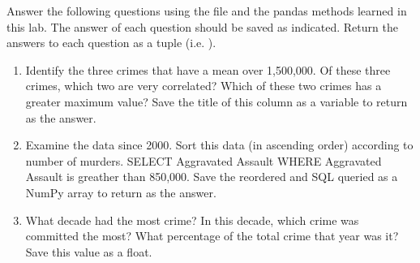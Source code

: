 \begin{problem}
Answer the following questions using the file  and the pandas methods learned in this lab.
The answer of each question should be saved as indicated.
Return the answers to each question as a tuple (i.e. ).

\begin{enumerate}
	\item Identify the three crimes that have a mean over 1,500,000. 
	Of these three crimes, which two are very correlated? 
	Which of these two crimes has a greater maximum value?
	Save the title of this column as a variable to return as the answer.
	\item Examine the data since 2000.
	Sort this data (in ascending order) according to number of murders.
	SELECT Aggravated Assault WHERE Aggravated Assault is greather than 850,000.
	Save the reordered and SQL queried  as a NumPy array to return as the answer.
	\item What decade had the most crime? 
	In this decade, which crime was committed the most? 
	What percentage of the total crime that year was it? 
	Save this value as a float.
\end{enumerate}
\end{problem}

